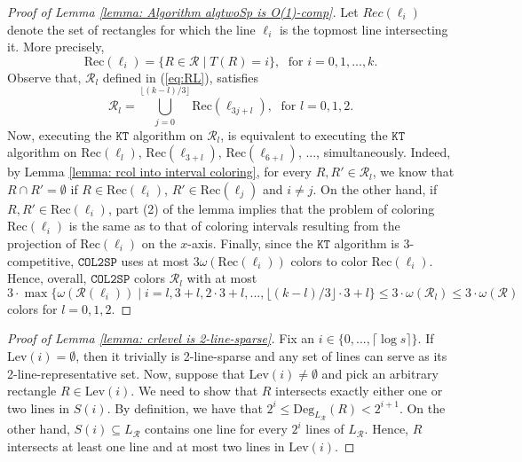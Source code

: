 \documentclass[a4paper,UKenglish]{lipics-v2016}
\newcommand{\icp}{\mbox{$\mathsf{ICP}$}}
\theoremstyle{plain}
\newcommand{\cR}{\mathcal{R}}
\newcommand{\algtwoSp}{\mathtt{COL2SP}}
\begin{document}
\begin{proof}[Proof of Lemma \ref{lemma: Algorithm algtwoSp is O(1)-comp}]
Let $\mathrm{}{Rec}(\ell_i)$ denote the set of rectangles for which the line $\ell_i$ is the topmost line intersecting it. More precisely,
\[
\mathrm{Rec}(\ell_i) = \{ R\in \cR \mid T(R)=i \},\; \text{ for } i=0,1,...,k.
\]
Observe that, $\cR_l$ defined in (\ref{eq:RL}), satisfies
\[
\cR_l=\bigcup_{j=0}^{\lfloor(k-l)/3\rfloor}\mathrm{Rec}(\ell_{3j+l}),\; \text{ for } l = 0, 1, 2.
\]
% 
Now, executing the $\mathtt{KT}$ algorithm on $\cR_l$, is equivalent to executing the $\mathtt{KT}$ algorithm on $\mathrm{Rec}(\ell_{l})$, $\mathrm{Rec}(\ell_{3+l})$, $\mathrm{Rec}(\ell_{6+l})$, ..., simultaneously. Indeed, by Lemma \ref{lemma: rcol into interval coloring}, for every $R,R'\in\cR_l$, we know that $R\cap R'=\emptyset$ if $R\in\mathrm{Rec}(\ell_i)$, $R'\in\mathrm{Rec}(\ell_j)$ and $i\neq j$. On the other hand, if $R,R'\in\mathrm{Rec}(\ell_i)$, part (2) of the lemma implies that the problem of coloring $\mathrm{Rec}(\ell_i)$ is the same as to that of coloring intervals resulting from the projection of $\mathrm{Rec}(\ell_i)$ on the $x$-axis.
%
Finally, since the $\mathtt{KT}$ algorithm is 3-competitive, $\algtwoSp$ uses at most $3\omega(\mathrm{Rec}(\ell_i))$ colors to color $\mathrm{Rec}(\ell_i)$. Hence, overall, $\algtwoSp$ colors $\cR_l$ with at most
\[
3\cdot \max\{\omega(\cR(\ell_i)) \mid i=l,3+l, 2\cdot 3+l,...,\lfloor(k-l)/3\rfloor\cdot 3+l \}\leq 3\cdot \omega(\cR_l) \leq 3\cdot \omega(\cR)
\] colors for $l=0,1,2$.
\end{proof}

\begin{proof}[Proof of Lemma \ref{lemma: crlevel is 2-line-sparse}]
Fix an $i\in\{0,...,\lceil \log s\rceil\}$. 
%
If $\mathrm{Lev}(i)=\emptyset$, then it trivially is 2-line-sparse and any set of lines can serve as its 2-line-representative set. Now, suppose that $\mathrm{Lev}(i)\neq\emptyset$ and pick an arbitrary rectangle $R\in \mathrm{Lev}(i)$.
%
We need to show that $R$ intersects exactly either one or two lines in $S(i)$. By definition, we have that $2^i\leq \mathrm{Deg}_{L_{\cR}}(R)<2^{i+1}$. On the other hand, $S(i)\subseteq L_{\cR}$ contains one line for every $2^i$ lines of $L_{\cR}$. Hence, $R$ intersects at least one line and at most two lines in $\mathrm{Lev}(i)$.
\end{proof}
\end{document}
